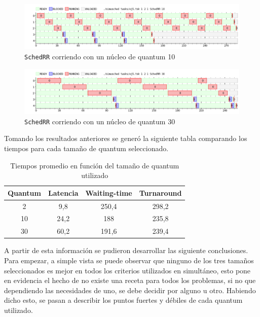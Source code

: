 \begin{figure}[H]
	\begin{center}
		\includegraphics[width=1\columnwidth]{imagenes/ej5_q10.png}
		\caption{\texttt{SchedRR} corriendo con un núcleo de quantum 10}
	\end{center}
\end{figure}

\begin{figure}[H]
	\begin{center}
		\includegraphics[width=1\columnwidth]{imagenes/ej5_q30.png}
		\caption{\texttt{SchedRR} corriendo con un núcleo de quantum 30}
	\end{center}
\end{figure}

Tomando los resultados anteriores se generó la siguiente tabla comparando los
tiempos para cada tamaño de quantum seleccionado.

\begin{table}[H]
	\begin{center}
		\begin{tabular}{|c|c|c|c|}
			\hline
			\textbf{Quantum} & \textbf{Latencia} & \textbf{Waiting-time} & \textbf{Turnaround} \\ \hline
			2 & 9,8 & 250,4 & 298,2 \\ \hline
			10 & 24,2 & 188 & 235,8 \\ \hline
			30 & 60,2 & 191,6 & 239,4 \\ \hline
		\end{tabular}
		\caption{Tiempos promedio en función del tamaño de quantum utilizado}
	\end{center}
\end{table}

A partir de esta información se pudieron desarrollar las siguiente conclusiones.
Para empezar, a simple vista se puede observar que ninguno de los tres tamaños
seleccionados es mejor en todos los criterios utilizados en simultáneo, esto
pone en evidencia el hecho de no existe una receta para todos los problemas, si
no que dependiendo las necesidades de uno, se debe decidir por alguno u otro.
Habiendo dicho esto, se pasan a describir los puntos fuertes y débiles de cada
quantum utilizado.

